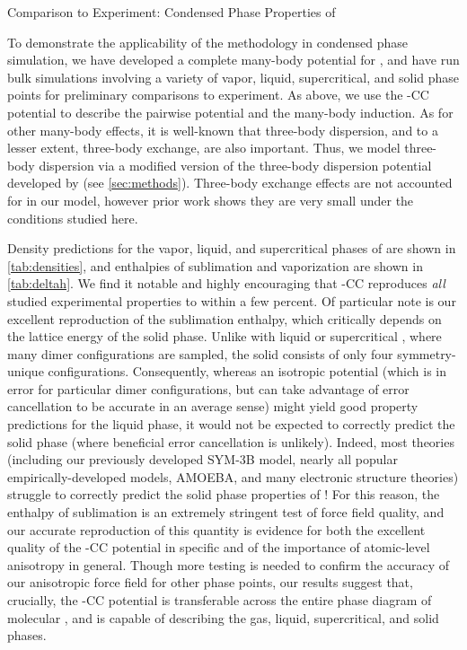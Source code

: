 \begin{subsection}{Comparison to Experiment: Condensed Phase Properties of \co}
\label{sec:co2}

To demonstrate the applicability of the \mastiff methodology in condensed
phase simulation, we have developed a complete
many-body potential for \co, and have run bulk simulations involving a variety
of vapor, liquid, supercritical, and solid phase points for preliminary
comparisons to experiment.  As above, we use the \mastiff-CC
potential to describe the pairwise potential and the many-body induction.
As for other many-body effects, it
is well-known\cite{Yu2012b,Hellmann2017,Oakley2009a} that three-body
dispersion, and to a lesser extent, three-body exchange, are also
important.\cite{Desgranges2015} 
Thus, 
we model three-body dispersion via a modified version of the three-body dispersion potential developed by
\citeauthor{Oakley2009a} (see \cref{sec:methods}).  Three-body exchange
effects are not accounted for in our model, however 
prior work shows they are very small under the conditions studied
here.\cite{Yu2012b}

Density predictions for the vapor, liquid, and supercritical phases of \co are
shown in \cref{tab:densities}, and enthalpies of
sublimation and vaporization are shown in \cref{tab:deltah}. 
%
We find it notable and highly encouraging that
\mastiff-CC reproduces \emph{all} studied experimental properties to within a
few percent. Of particular note is our excellent reproduction of the
sublimation enthalpy, which critically depends on the lattice energy of the
solid phase. Unlike with liquid or supercritical \co, where
many dimer configurations are sampled,
the
solid consists of only four symmetry-unique
configurations. Consequently, whereas an isotropic
potential (which is in error for particular dimer
configurations, but can take advantage of error cancellation to be accurate in an average sense) 
might yield good property predictions for the liquid phase, 
it would not be expected to correctly predict the solid phase (where beneficial
error cancellation is unlikely). 
Indeed, most theories (including our previously developed SYM-3B
model,\cite{Yu2012b} nearly all popular empirically-developed \co
models,\cite{Perez-Sanchez2013} AMOEBA,\cite{Heit2016a} and many electronic
structure theories\cite{Heit2016a}) struggle to correctly predict the solid phase
properties of \co! For this reason, 
the enthalpy of sublimation is
an extremely stringent test of force field
quality,\cite{Perez-Sanchez2013} 
and our accurate reproduction
of this quantity is evidence for both the excellent quality of the \mastiff-CC
potential in specific and of the importance of atomic-level anisotropy in
general.
Though more testing is needed to confirm
the accuracy of our anisotropic force field for
other phase points, our results suggest that, crucially, the
\mastiff-CC potential is transferable across the entire phase diagram of
molecular \co, and is capable of describing the gas, liquid, supercritical,
and solid phases. 


\end{subsection}
